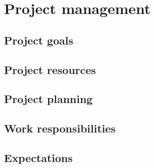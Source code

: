 %
\section{Project management}

\subsection{Project goals}

\subsection{Project resources}

\subsection{Project planning}

\subsection{Work responsibilities}

\subsection{Expectations}